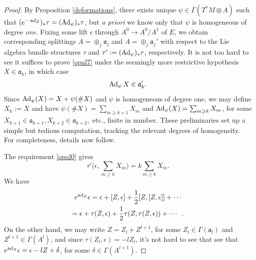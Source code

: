\documentclass[leqno,12pt]{amsart} %
\begin{document}
\begin{proof}
  By Proposition \ref{deformations}, there exists unique
  $\psi \in \Gamma(T^*\!M \otimes A)$ such that
  $(e^{-\operatorname{ad}_Z})_*\tau = (\operatorname{Ad}_\psi)_* \tau$, but {\em a priori} we know only that
  $\psi $ is homogeneous of degree {\em one}. Fixing some lift $\epsilon $ through
  $A^0 \rightarrow A^0/A^1$ of $E$, we obtain corresponding splittings
  $A = \oplus_j {\mathfrak a}_j$ and $A = \oplus_j {\mathfrak a}_j'$ with respect to the
  Lie algebra bundle structures $\tau $ and $\tau':=(\operatorname{Ad}_\psi)_*\tau$,
  respectively. It is not too hard to see it suffices to prove \eqref{opal7} under the
  seemingly more restrictive hypothesis $X \in {\mathfrak a}_k$, in which case
  \begin{equation}
    \label{opal0}
    \operatorname{Ad}_\psi X \in {\mathfrak a}_k'.
  \end{equation}
  Since $\operatorname{Ad}_\psi(X) = X + \psi(\#X)$ and $\psi$ is homogeneous of degree one, we may
  define $X_k:=X$ and have $\psi(\#X) = \sum_{m\ge k + 1} X_m$ and
  $\operatorname{Ad}_\psi(X)=\sum_{m\geqslant k} X_m$, for some
  $X_{k+1} \in {\mathfrak a}_{k+1}, X_{k+2}\in {\mathfrak a}_{k+2},$ etc., finite in
  number. These preliminaries set up a simple but tedious computation, tracking the
  relevant degrees of homogeneity. For completeness, details now follow.

  The requirement \eqref{opal0} gives
  \begin{equation}
    \label{opal8}
    \tau'\big(\epsilon, \sum_{m\ge k}X_m\big) = k\sum_{m\ge k}X_m.
  \end{equation}
  We have
  \begin{gather*}
     e^{\operatorname{ad}_Z}\epsilon=\epsilon +[Z, \epsilon] + \frac{1}{2}[Z,[Z,\epsilon]] + \cdots\\
       =\epsilon +\tau(Z, \epsilon) + \frac{1}{2}\tau(Z,\tau(Z,\epsilon)) + \cdots\enspace.
  \end{gather*}
  On the other hand, we may write $Z = Z_l + Z^{l+1}$, for some
  $Z_l \in \Gamma({\mathfrak a}_l)$ and $Z^{l+1} \in \Gamma(A^l)$, and since
  $\tau(Z_l, \epsilon) = - lZ_l$, it's not hard to see that see that
  $e^{\operatorname{ad}_Z}\epsilon = \epsilon - l Z + \delta $, for some
  $\delta \in \Gamma(A^{l+1})$.


\end{proof}
\end{document}
